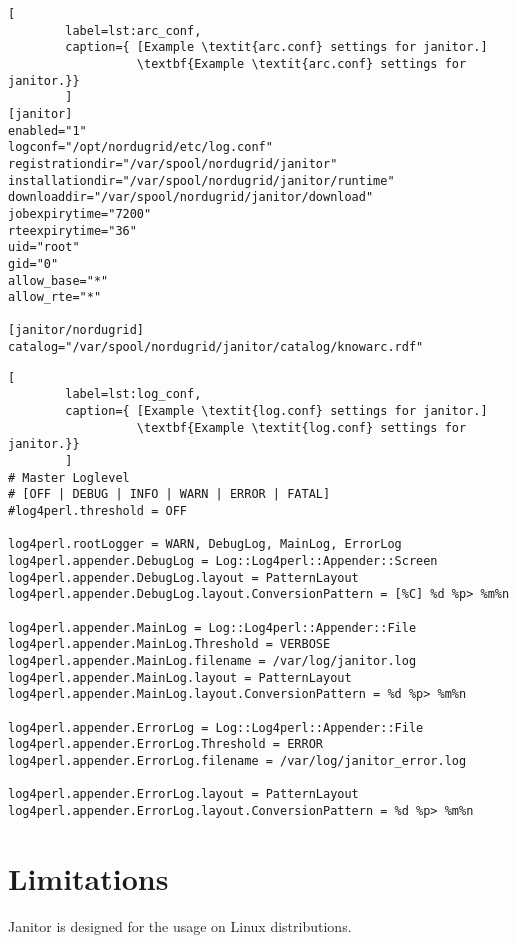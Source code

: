 \begin{lstlisting}[
        label=lst:arc_conf,
        caption={ [Example \textit{arc.conf} settings for janitor.]
                  \textbf{Example \textit{arc.conf} settings for janitor.}}
        ]
[janitor]
enabled="1"
logconf="/opt/nordugrid/etc/log.conf"
registrationdir="/var/spool/nordugrid/janitor"
installationdir="/var/spool/nordugrid/janitor/runtime"
downloaddir="/var/spool/nordugrid/janitor/download"
jobexpirytime="7200"
rteexpirytime="36"
uid="root"
gid="0"
allow_base="*"
allow_rte="*"

[janitor/nordugrid]
catalog="/var/spool/nordugrid/janitor/catalog/knowarc.rdf"
\end{lstlisting}

\begin{lstlisting}[
        label=lst:log_conf,
        caption={ [Example \textit{log.conf} settings for janitor.]
                  \textbf{Example \textit{log.conf} settings for janitor.}}
        ]
# Master Loglevel
# [OFF | DEBUG | INFO | WARN | ERROR | FATAL]
#log4perl.threshold = OFF

log4perl.rootLogger = WARN, DebugLog, MainLog, ErrorLog
log4perl.appender.DebugLog = Log::Log4perl::Appender::Screen
log4perl.appender.DebugLog.layout = PatternLayout
log4perl.appender.DebugLog.layout.ConversionPattern = [%C] %d %p> %m%n

log4perl.appender.MainLog = Log::Log4perl::Appender::File
log4perl.appender.MainLog.Threshold = VERBOSE
log4perl.appender.MainLog.filename = /var/log/janitor.log
log4perl.appender.MainLog.layout = PatternLayout
log4perl.appender.MainLog.layout.ConversionPattern = %d %p> %m%n

log4perl.appender.ErrorLog = Log::Log4perl::Appender::File
log4perl.appender.ErrorLog.Threshold = ERROR
log4perl.appender.ErrorLog.filename = /var/log/janitor_error.log

log4perl.appender.ErrorLog.layout = PatternLayout
log4perl.appender.ErrorLog.layout.ConversionPattern = %d %p> %m%n
\end{lstlisting}



\section{Limitations}

Janitor is designed for the usage on Linux distributions.

